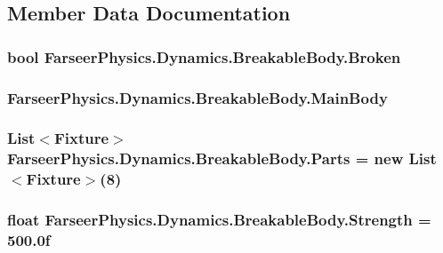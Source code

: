 \subsection{Member Data Documentation}
\hypertarget{class_farseer_physics_1_1_dynamics_1_1_breakable_body_a16ad5811f16ea5710b06b5c1f99ae29a}{
\subsubsection[{Broken}]{\setlength{\rightskip}{0pt plus 5cm}bool Farseer\+Physics.\+Dynamics.\+Breakable\+Body.\+Broken}}\label{class_farseer_physics_1_1_dynamics_1_1_breakable_body_a16ad5811f16ea5710b06b5c1f99ae29a}
\hypertarget{class_farseer_physics_1_1_dynamics_1_1_breakable_body_a4b9f2642b0aa11a4ef658a90b323c314}{
\subsubsection[{Main\+Body}]{ Farseer\+Physics.\+Dynamics.\+Breakable\+Body.\+Main\+Body}}\label{class_farseer_physics_1_1_dynamics_1_1_breakable_body_a4b9f2642b0aa11a4ef658a90b323c314}
\hypertarget{class_farseer_physics_1_1_dynamics_1_1_breakable_body_a2a80b7144e2c9e8e22e47dfdcd3615d7}{
\subsubsection[{Parts}]{\setlength{\rightskip}{0pt plus 5cm}List$<${\bf Fixture}$>$ Farseer\+Physics.\+Dynamics.\+Breakable\+Body.\+Parts = new List$<${\bf Fixture}$>$(8)}}\label{class_farseer_physics_1_1_dynamics_1_1_breakable_body_a2a80b7144e2c9e8e22e47dfdcd3615d7}
\hypertarget{class_farseer_physics_1_1_dynamics_1_1_breakable_body_a313f8f8c6e68a48af90c79925a2ad41d}{
\subsubsection[{Strength}]{\setlength{\rightskip}{0pt plus 5cm}float Farseer\+Physics.\+Dynamics.\+Breakable\+Body.\+Strength = 500.\+0f}}\label{class_farseer_physics_1_1_dynamics_1_1_breakable_body_a313f8f8c6e68a48af90c79925a2ad41d}


